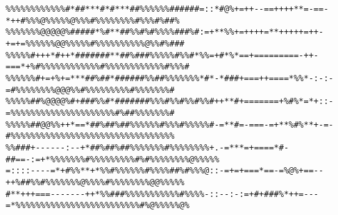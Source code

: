 \documentclass[a4paper, 12pt, oneside]{article}
\begin{document}
\begin{verbatim}
%%%%%%%%%%%%#*##***#*#***##%%%%%%######=::*#@%+=++--==++++**=-==-*++#%%%@%%%%%@%%%#%%%%%%%%#%%%#%##%
%%%%%%%@@@@@%#####*%#**##%%#%#%%%%###%#:=+**%%+=++++=**+++++=++-+=+=%%%%%%@@%%%%%#%%%%%%%%%%@%%#%###
%%%%%#+++*#++*#######**##%###%%%%%#%%#*%%=+#*%*==+=========-++-===*+%#%%%%%%%%%%%%#%%%%%%%%%%%%#%%%#
%%%%%%#+=+%+=***##%##*######%%##%%%%%%%*#*-*###+===++====*%%*-:-:-=#%%%%%%%%@@@%%#%%%%%%%%%#%%%%%%%#
%%%%%##%@@@@%#+###%%#*#######%%%#%%#%%#%%#++**#+=======+%#%*=*+::-=%%%%%%%%%%%%%%%%%%%%%#%##%%%%%%%#
%%%%%##@@%%++*==*##%##%##%%%%%%#%%%#%%%%%#-=**#=-===-=+**%#%**+-=-#%%%%%%%%%%%%%%%%%%%%%%%%%%%%%%%%%
%%###+------:--+*##%##%##%%%%%%%#%%%%%%%%+.-=***=+====*#-##==-:=+*%%%%%%%#%%%%%%%%%#%#%%%%%%%%@%%%%%
=::::----=*+#%%**+*%%#%%%%%%#%%%%##%#%%%@::-=+=+===*==-=%@%+==--++%##%%#%%%%%%%@%%%%#%%%%%%%%@@%%%%%
#**+++===-------++*%%###%%%%%%%%%%%#%%%%-::--:-:=+#+###%*++=---=*%%%%%%%%%%%%%%%%%%%%%%%%%#%@%%%%%@%
\end{verbatim}

\end{document}
